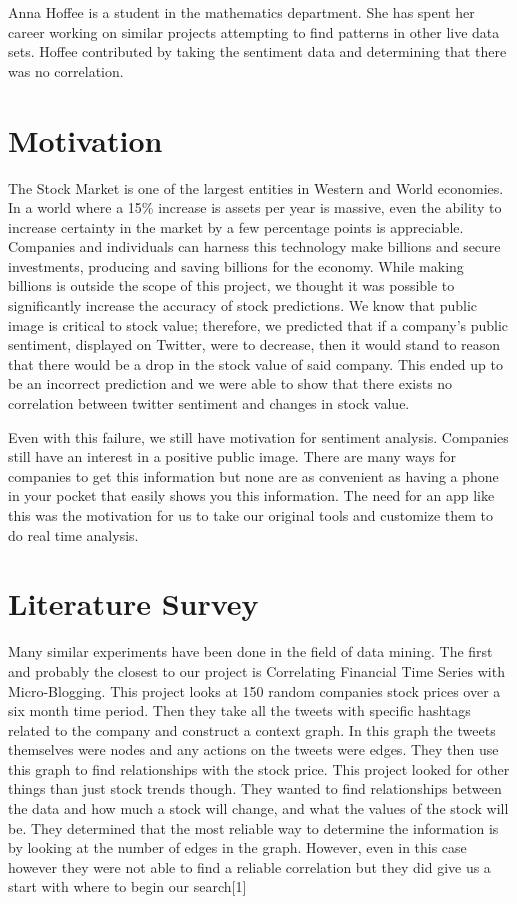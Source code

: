 \documentclass{acm_proc_article-sp}
\begin{document}
Anna Hoffee is a student in the mathematics department. She has spent her
career working on similar projects attempting to find patterns in other live
data sets. Hoffee contributed by taking the sentiment data and determining that
there was no correlation.

\section{Motivation}

The Stock Market is one of the largest entities in Western and World economies.
In a world where a 15\% increase is assets per year is massive,  even the
ability to increase certainty in the market by a few percentage points is appreciable.
Companies and individuals can harness this technology make billions and secure
investments, producing and saving billions for the economy. While making
billions is outside the scope of this project, we thought it was possible to
significantly increase the accuracy of stock predictions. We know that public
image is critical to stock value; therefore, we predicted that if a company's
public sentiment, displayed on Twitter, were to decrease, then it would stand to reason
that there would be a drop in the stock value of said company. This ended up to be an
incorrect prediction and we were able to show that there exists no correlation
between twitter sentiment and changes in stock value.

Even with this failure, we still have motivation for sentiment analysis.
Companies still have an interest in a positive public image. There are many
ways for companies to get this information but none are as convenient as having
a phone in your pocket that easily shows you this information. The need for an
app like this was the motivation for us to take our original tools and
customize them to do real time analysis. 

\section{Literature Survey}

Many similar experiments have been done in the field of data mining. The first
and probably the closest to our project is Correlating Financial Time Series
with Micro-Blogging. This project looks at 150 random companies stock prices
over a six month time period. Then they take all the tweets with specific
hashtags related to the company and construct a context graph. In this graph
the tweets themselves were nodes and any actions on the tweets were edges. They
then use this graph to find relationships with the stock price. This project
looked for other things than just stock trends though. They wanted to find
relationships between the data and how much a stock will change, and what the
values of the stock will be. They determined that the most reliable way to
determine the information is by looking at the number of edges in the graph.
However, even in this case however they were not able to find a reliable
correlation but they did give us a start with where to begin our search[1] 
\end{document}
